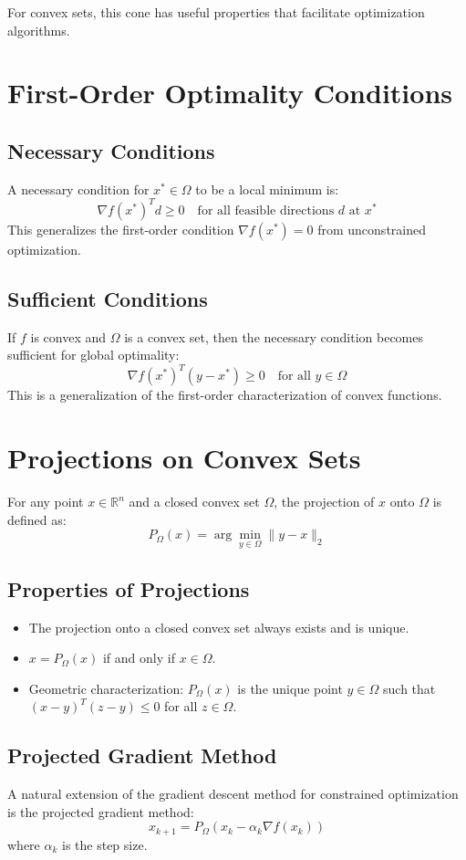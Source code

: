For convex sets, this cone has useful properties that facilitate optimization algorithms.

\section{First-Order Optimality Conditions}

\subsection{Necessary Conditions}
A necessary condition for $x^* \in \Omega$ to be a local minimum is:
\[
\nabla f(x^*)^T d \geq 0 \quad \text{for all feasible directions } d \text{ at } x^*
\]
This generalizes the first-order condition $\nabla f(x^*) = 0$ from unconstrained optimization.

\subsection{Sufficient Conditions}
If $f$ is convex and $\Omega$ is a convex set, then the necessary condition becomes sufficient for global optimality:
\[
\nabla f(x^*)^T (y - x^*) \geq 0 \quad \text{for all } y \in \Omega
\]
This is a generalization of the first-order characterization of convex functions.

\section{Projections on Convex Sets}
For any point $x \in \mathbb{R}^n$ and a closed convex set $\Omega$, the projection of $x$ onto $\Omega$ is defined as:
\[
P_\Omega(x) = \arg\min_{y \in \Omega} \|y - x\|_2
\]

\subsection{Properties of Projections}
\begin{itemize}
    \item The projection onto a closed convex set always exists and is unique.
    \item $x = P_\Omega(x)$ if and only if $x \in \Omega$.
    \item Geometric characterization: $P_\Omega(x)$ is the unique point $y \in \Omega$ such that $(x - y)^T(z - y) \leq 0$ for all $z \in \Omega$.
\end{itemize}

\subsection{Projected Gradient Method}
A natural extension of the gradient descent method for constrained optimization is the projected gradient method:
\[
x_{k+1} = P_\Omega(x_k - \alpha_k \nabla f(x_k))
\]
where $\alpha_k$ is the step size.

